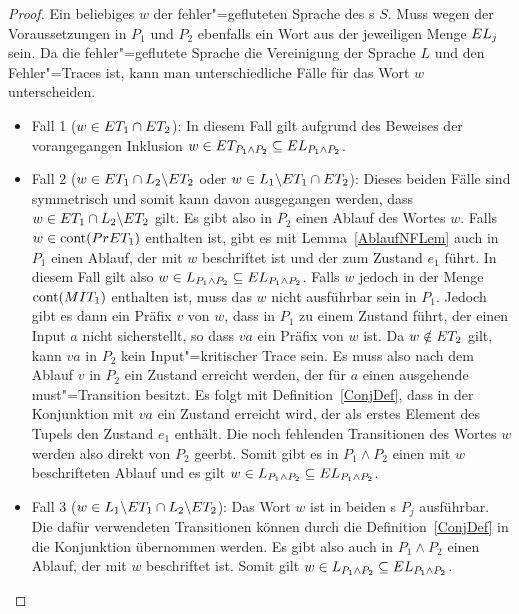 \begin{proof}
  Ein beliebiges $w$ der fehler"=gefluteten Sprache des \MEIO{}s $S$. Muss
  wegen der Voraussetzungen in $P_1$ und $P_2$ ebenfalls ein Wort aus der
  jeweiligen Menge $EL _j$ sein. Da die fehler"=geflutete Sprache die
  Vereinigung der Sprache $L$ und den Fehler"=Traces \ET{} ist, kann man
  unterschiedliche Fälle für das Wort $w$ unterscheiden.
  \begin{itemize}
    \item Fall 1 ($w\in ET _1\cap ET _2$): In diesem Fall gilt aufgrund des
      Beweises der vorangegangen Inklusion $w\in ET _{P_1\land P_2}\subseteq
      EL _{P_1\land P_2}$.
    \item Fall 2 ($w\in ET _1\cap L_2\backslash ET _2$ oder $w\in
      L_1\backslash ET _1\cap ET _2$): Dieses beiden Fälle sind symmetrisch
      und somit kann \oBdA{} davon ausgegangen werden, dass $w\in ET _1\cap
      L_2\backslash ET _2$ gilt. Es gibt also in $P_2$ einen Ablauf des Wortes
      $w$. Falls $w\in\mathrm{cont} (PrET _1)$ enthalten ist, gibt es mit
      Lemma~\ref{AblaufNFLem} auch in $P_1$ einen Ablauf, der mit $w$
      beschriftet ist und der zum Zustand $e_1$ führt. In diesem Fall gilt also
      $w\in L_{P_1\land P_2}\subseteq EL _{P_1\land P_2}$. Falls $w$ jedoch in
      der Menge $\mathrm{cont} (MIT _1)$ enthalten ist, muss das $w$ nicht ausführbar
      sein in $P_1$. Jedoch gibt es dann ein Präfix $v$ von $w$, dass in $P_1$
      zu einem Zustand führt, der einen Input $a$ nicht sicherstellt, so dass
      $va$ ein Präfix von $w$ ist. Da $w\notin ET _2$ gilt, kann $va$ in $P_2$
      kein Input"=kritischer Trace sein. Es muss also nach dem Ablauf $v$ in
      $P_2$ ein Zustand erreicht werden, der für $a$ einen ausgehende
      must"=Transition besitzt. Es folgt mit Definition~\ref{ConjDef}, dass in
      der Konjunktion mit $va$ ein Zustand erreicht wird, der als erstes
      Element des Tupels den Zustand $e_1$ enthält. Die noch fehlenden
      Transitionen des Wortes $w$ werden also direkt von $P_2$ geerbt. Somit
      gibt es in $P_1\land P_2$ einen mit $w$ beschrifteten Ablauf und es gilt
      $w\in L_{P_1\land P_2}\subseteq EL _{P_1\land P_2}$.
    \item Fall 3 ($w\in L_1\backslash ET _1 \cap L_2\backslash ET _2$): Das
      Wort $w$ ist in beiden \MEIO{}s $P_j$ ausführbar. Die dafür verwendeten
      Transitionen können durch die Definition~\ref{ConjDef} in die Konjunktion
      übernommen werden. Es gibt also auch in $P_1\land P_2$ einen Ablauf, der
      mit $w$ beschriftet ist. Somit gilt $w\in L_{P_1\land P_2}\subseteq EL
      _{P_1\land P_2}$.
  \end{itemize}


\end{proof}
